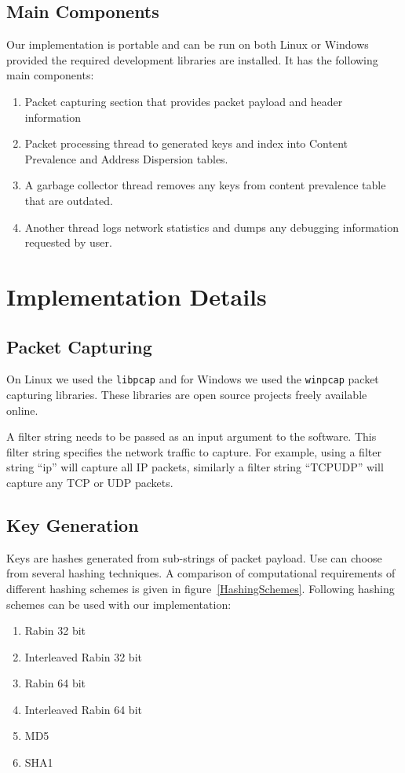 \documentclass{report}
\begin{document}
\section{Main Components}
Our implementation is portable and can be run on both Linux or Windows provided the required development libraries are installed. It has the following main components:
\begin{enumerate}
\item Packet capturing section that provides packet payload and header information
\item Packet processing thread to generated keys and index into Content Prevalence and Address Dispersion tables.
\item A garbage collector thread removes any keys from content prevalence table that are outdated.
\item Another thread logs network statistics and dumps any debugging information requested by user.
\end{enumerate}

\chapter{Implementation Details}

\section{Packet Capturing}
On Linux we used the \texttt{libpcap} and for Windows we used the \texttt{winpcap} packet capturing libraries. These libraries are open source projects freely available online.

A filter string needs to be passed as an input argument to the software. This filter string specifies the network traffic to capture. For example, using a filter string ``ip'' will capture all IP packets, similarly a filter string ``TCP\textbar\textbar UDP'' will capture any TCP or UDP packets.

\section{Key Generation}
Keys are hashes generated from sub-strings of packet payload. Use can choose from several hashing techniques. A comparison of computational requirements of different hashing schemes is given in figure~\ref{HashingSchemes}. Following hashing schemes can be used with our implementation:
\begin{enumerate}
\item Rabin 32 bit
\item Interleaved Rabin 32 bit
\item Rabin 64 bit
\item Interleaved Rabin 64 bit
\item MD5
\item SHA1
\end{enumerate}
\end{document}
